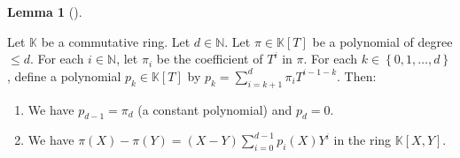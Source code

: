 \documentclass[numbers=enddot,12pt,final,onecolumn,notitlepage]{scrartcl}%
\theoremstyle{definition}
\newtheorem{lem}[theo]{Lemma}
\newenvironment{lemma}[1][]
{\begin{lem}[#1]\begin{leftbar}}
{\end{leftbar}\end{lem}}
\let\sumnonlimits\sum
\renewcommand{\sum}{\sumnonlimits\limits}
\begin{document}
\begin{lemma}
\label{lem.F.u(pi).dividiff}Let $\mathbb{K}$ be a commutative ring. Let
$d\in\mathbb{N}$. Let $\pi\in\mathbb{K}\left[  T\right]  $ be a polynomial of
degree $\leq d$. For each $i\in\mathbb{N}$, let $\pi_{i}$ be the coefficient
of $T^{i}$ in $\pi$. For each $k\in\left\{  0,1,\ldots,d\right\}  $, define a
polynomial $p_{k}\in\mathbb{K}\left[  T\right]  $ by $p_{k}=\sum_{i=k+1}%
^{d}\pi_{i}T^{i-1-k}$. Then:

\begin{enumerate}
\item[\textbf{(a)}] We have $p_{d-1}=\pi_{d}$ (a constant polynomial) and
$p_{d}=0$.

\item[\textbf{(b)}] We have $\pi\left(  X\right)  -\pi\left(  Y\right)
=\left(  X-Y\right)  \sum_{i=0}^{d-1}p_{i}\left(  X\right)  Y^{i}$ in the ring
$\mathbb{K}\left[  X,Y\right]  $.
\end{enumerate}
\end{lemma}
\end{document}
